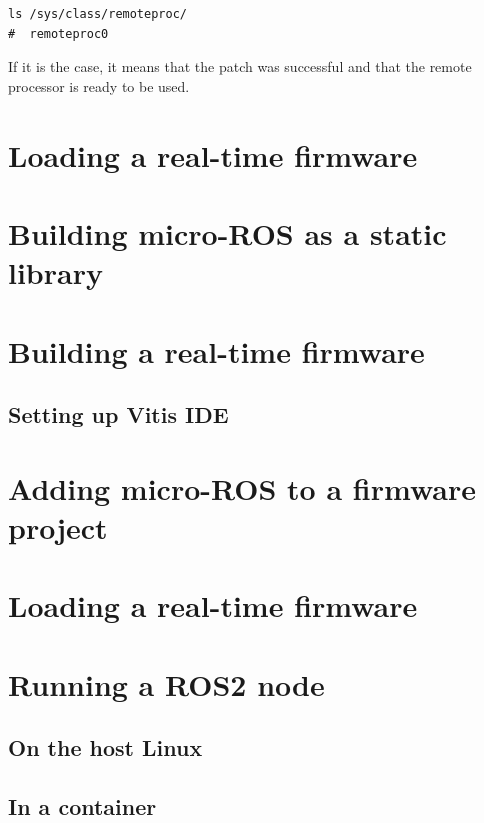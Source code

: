 \documentclass[10pt]{article}
\begin{document}
\begin{verbatim}
ls /sys/class/remoteproc/
#  remoteproc0
\end{verbatim}

If it is the case, it means that the patch was successful and  that the remote processor is
ready to be used.




\section{Loading a real-time firmware}
\label{sec:orgb9c8cfb}

\section{Building micro-ROS as a static library}
\label{sec:org0bd41f3}

\section{Building a real-time firmware}
\label{sec:org3ce0120}

\subsection{Setting up Vitis IDE}
\label{sec:org06ad67f}

\section{Adding micro-ROS to a firmware project}
\label{sec:orgaddbf1b}

\section{Loading a real-time firmware}
\label{sec:orgc665e99}

\section{Running a ROS2 node}
\label{sec:org9804614}

\subsection{On the host Linux}
\label{sec:orgbb82369}

\subsection{In a container}
\label{sec:orgf14de3e}
\end{document}
